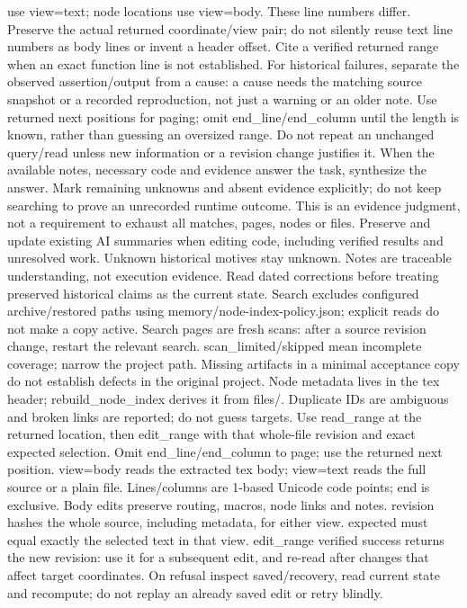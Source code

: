 use view=text; node locations use view=body. These line numbers differ. Preserve
the actual returned coordinate/view pair; do not silently reuse text line numbers
as body lines or invent a header offset. Cite a verified returned range when an
exact function line is not established. For historical failures, separate the
observed assertion/output from a cause: a cause needs the matching source snapshot
or a recorded reproduction, not just a warning or an older note.
Use returned next positions for paging; omit end_line/end_column until the
length is known, rather than guessing an oversized range. Do not repeat an
unchanged query/read unless new information or a revision change justifies it.
When the available notes, necessary code and evidence answer the task, synthesize
the answer. Mark remaining unknowns and absent evidence explicitly; do not keep
searching to prove an unrecorded runtime outcome. This is an evidence judgment,
not a requirement to exhaust all matches, pages, nodes or files.
Preserve and update existing AI summaries when editing code, including verified
results and unresolved work. Unknown historical motives stay unknown. Notes
are traceable understanding, not execution evidence. Read dated corrections
before treating preserved historical claims as the current state.
Search excludes configured archive/restored paths using memory/node-index-policy.json;
explicit reads do not make a copy active. Search pages are fresh scans: after a
source revision change, restart the relevant search. scan_limited/skipped mean
incomplete coverage; narrow the project path. Missing artifacts in a minimal
acceptance copy do not establish defects in the original project.
Node metadata lives in the tex header; rebuild_node_index derives it from files/.
Duplicate IDs are ambiguous and broken links are reported; do not guess targets.
Use read_range at the returned location, then edit_range with that whole-file
revision and exact expected selection. Omit end_line/end_column to page; use the
returned next position. view=body reads the extracted tex body; view=text reads
the full source or a plain file. Lines/columns are 1-based Unicode code points;
end is exclusive. Body edits preserve routing, macros, node links and notes.
revision hashes the whole source, including metadata, for either view. expected
must equal exactly the selected text in that view. edit_range verified success
returns the new revision: use it for a subsequent edit, and re-read after changes
that affect target coordinates. On refusal inspect saved/recovery, read current
state and recompute; do not replay an already saved edit or retry blindly.
